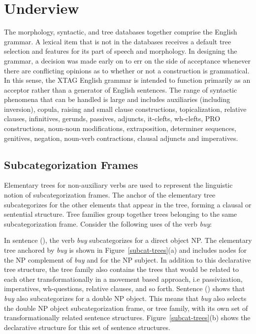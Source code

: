 \chapter{Underview}
\label{underview}

The morphology, syntactic, and tree databases together comprise the
English grammar.  A lexical item that is not in the databases receives
a default tree selection and features for its part of speech and
morphology.  In designing the grammar, a decision was made early on to
err on the side of acceptance whenever there are conflicting opinions
as to whether or not a construction is grammatical.  In this sense,
the XTAG English grammar is intended to function primarily as an
acceptor rather than a generator of English sentences.  The range of
syntactic phenomena that can be handled is large and includes
auxiliaries (including inversion), copula, raising and small clause
constructions, topicalization, relative clauses, infinitives, gerunds,
passives, adjuncts, it-clefts, wh-clefts, PRO constructions, noun-noun
modifications, extraposition, determiner sequences, genitives,
negation, noun-verb contractions, clausal adjuncts and imperatives.

\section{Subcategorization Frames}
\label{subcat-frames}

Elementary trees for non-auxiliary verbs are used to represent the linguistic
notion of subcategorization frames.  The anchor of the elementary tree
subcategorizes for the other elements that appear in the tree, forming a
clausal or sentential structure.  Tree families group together trees belonging
to the same subcategorization frame.  Consider the following uses of the verb
{\it buy}:


In sentence (), the verb {\it buy} subcategorizes for a direct
object NP.  The elementary tree anchored by {\it buy} is shown in
Figure~\ref{subcat-trees}(a) and includes nodes for the NP complement
of {\it buy} and for the NP subject.  In addition to this declarative
tree structure, the tree family also contains the trees that would be
related to each other transformationally in a movement based approach,
i.e passivization, imperatives, wh-questions, relative clauses, and so
forth.  Sentence () shows that {\it buy} also subcategorizes for
a double NP object.  This means that {\it buy} also selects the double
NP object subcategorization frame, or tree family, with its own set of
transformationally related sentence structures.
Figure~\ref{subcat-trees}(b) shows the declarative structure for this
set of sentence structures.


